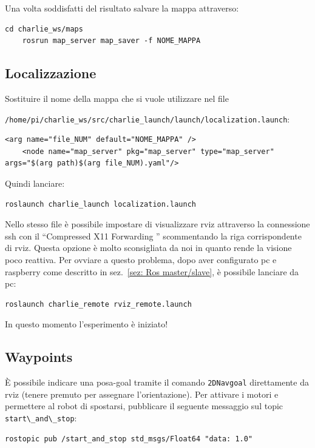Una volta soddisfatti del risultato salvare la mappa attraverso:
\begin{lstlisting}[style=bash]
	cd charlie_ws/maps
	rosrun map_server map_saver -f NOME_MAPPA
\end{lstlisting}

\subsection*{Localizzazione}
Sostituire il nome della mappa che si vuole utilizzare nel file

\verb|/home/pi/charlie_ws/src/charlie_launch/launch/localization.launch|:

\begin{lstlisting}[style=xml, firstnumber=14]
	<arg name="file_NUM" default="NOME_MAPPA" />
	<node name="map_server" pkg="map_server" type="map_server" args="$(arg path)$(arg file_NUM).yaml"/>
\end{lstlisting}

Quindi lanciare:
\begin{lstlisting}[style=bash]
	roslaunch charlie_launch localization.launch
\end{lstlisting}

Nello stesso file \`e possibile impostare di visualizzare rviz attraverso la connessione ssh con il ``Compressed X11 Forwarding '' scommentando la riga corrispondente di rviz. Questa opzione \`e molto sconsigliata da noi in quanto rende la visione poco reattiva. Per ovviare a questo problema, dopo aver configurato pc e raspberry come descritto in sez.~\ref{sez: Ros master/slave}, \`e possibile lanciare da pc:

\begin{lstlisting}[style=bashPC]
	roslaunch charlie_remote rviz_remote.launch
\end{lstlisting}
In questo momento l'esperimento \`e iniziato!

\subsection*{Waypoints}
\`E possibile indicare una posa-goal tramite il comando \texttt{2DNavgoal} direttamente da rviz (tenere premuto per assegnare l'orientazione).
Per attivare i motori e permettere al robot di spostarsi, pubblicare il seguente messaggio sul topic \verb|start\_and\_stop|:

\begin{lstlisting}[style=bash]
	rostopic pub /start_and_stop std_msgs/Float64 "data: 1.0"
\end{lstlisting}

